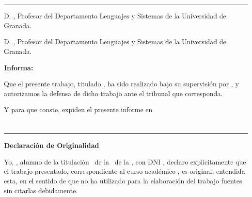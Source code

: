 \chapter*{}
\thispagestyle{empty}

\noindent\rule[-1ex]{\textwidth}{2pt}\par\vspace{\dimexpr4.5ex+\baselineskip\relax}

D. \director, Profesor del Departamento Lenguajes y Sistemas de la Universidad de Granada.\par\vspace{\baselineskip}

D. \otrodirector, Profesor del Departamento Lenguajes y Sistemas de la Universidad de Granada.\par\vspace{\baselineskip}

\vspace{0.5cm}

\textbf{Informa:}\par\vspace{\baselineskip}

Que el presente trabajo, titulado \thetitle, ha sido realizado bajo su supervisión por \theauthor, y autorizamos la defensa de dicho trabajo ante el tribunal que corresponda.

\vspace{1cm}

Y para que conste, expiden el presente informe en \myLocation

\chapter*{}
\thispagestyle{empty}

\noindent\rule[-1ex]{\textwidth}{2pt}\par\vspace{\dimexpr4.5ex+\baselineskip\relax}

\textbf{Declaración de Originalidad}\par\vspace{\baselineskip}

Yo, \textbf{\theauthor}, alumno de la titulación \grado \ de la \myFacultyShort \ de la \myUni, con DNI \dni, declaro explícitamente que el trabajo presentado, correspondiente al curso académico \curso, es original, entendida esta, en el sentido de que no ha utilizado para la elaboración del trabajo fuentes sin citarlas debidamente.

\vspace{4cm}

